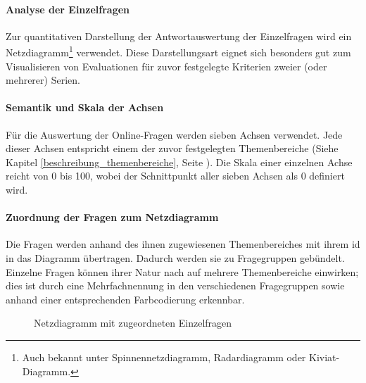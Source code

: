 \documentclass[../../main.tex]{subfiles}
\begin{document}
\paragraph*{Analyse der Einzelfragen}\mbox{}

\begin{sloppypar}
Zur quantitativen Darstellung der Antwortauswertung der Einzelfragen wird ein Netzdiagramm\footnote{Auch bekannt unter Spinnennetzdiagramm, Radardiagramm oder Kiviat-Diagramm.} verwendet. Diese Darstellungsart eignet sich besonders gut zum Visualisieren von Evaluationen für zuvor festgelegte Kriterien zweier (oder mehrerer) Serien. 
\end{sloppypar}


\paragraph*{Semantik und Skala der Achsen}\mbox{}

\begin{sloppypar}
Für die Auswertung der Online-Fragen werden sieben Achsen verwendet. Jede dieser Achsen entspricht einem der zuvor festgelegten Themenbereiche (Siehe Kapitel \ref{beschreibung_themenbereiche}, Seite \pageref{beschreibung_themenbereiche}). Die Skala einer einzelnen Achse reicht von 0 bis 100, wobei der Schnittpunkt aller sieben Achsen als 0 definiert wird.\footnotemark
\end{sloppypar}


\paragraph*{Zuordnung der Fragen zum Netzdiagramm}\mbox{}

\begin{sloppypar}
Die Fragen werden anhand des ihnen zugewiesenen Themenbereiches mit ihrem \acrfull{id} in das Diagramm übertragen. Dadurch werden sie zu Fragegruppen gebündelt. Einzelne Fragen können ihrer Natur nach auf mehrere Themenbereiche einwirken; dies ist durch eine Mehrfachnennung in den verschiedenen Fragegruppen sowie anhand einer entsprechenden Farbcodierung erkennbar.
\end{sloppypar}

\begin{figure}[H]
 \centering
    
 \caption{Netzdiagramm mit zugeordneten Einzelfragen}
 \label{Netzdiagramm Schema fragepositionen}
\end{figure}
\end{document}
